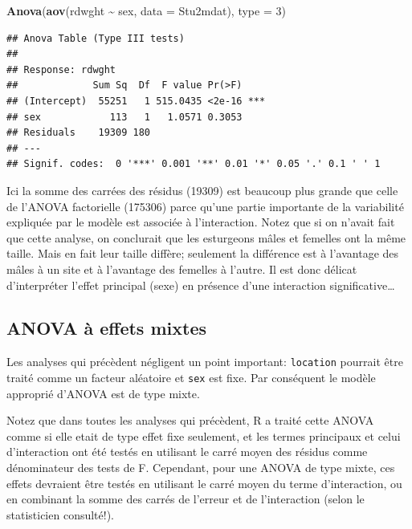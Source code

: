 \documentclass[
  12pt,
]{book}
\newenvironment{Shaded}{\begin{snugshade}}{\end{snugshade}}
\newcommand{\DataTypeTok}[1]{\textcolor[rgb]{0.13,0.29,0.53}{#1}}
\newcommand{\DecValTok}[1]{\textcolor[rgb]{0.00,0.00,0.81}{#1}}
\newcommand{\KeywordTok}[1]{\textcolor[rgb]{0.13,0.29,0.53}{\textbf{#1}}}
\newcommand{\NormalTok}[1]{#1}
\newcommand{\OperatorTok}[1]{\textcolor[rgb]{0.81,0.36,0.00}{\textbf{#1}}}
\newcommand{\StringTok}[1]{\textcolor[rgb]{0.31,0.60,0.02}{#1}}
\begin{document}
\begin{Shaded}
\begin{Highlighting}[]
\KeywordTok{Anova}\NormalTok{(}\KeywordTok{aov}\NormalTok{(rdwght }\OperatorTok{\textasciitilde{}}\StringTok{ }\NormalTok{sex, }\DataTypeTok{data =}\NormalTok{ Stu2mdat), }\DataTypeTok{type =} \DecValTok{3}\NormalTok{)}
\end{Highlighting}
\end{Shaded}

\begin{verbatim}
## Anova Table (Type III tests)
## 
## Response: rdwght
##             Sum Sq  Df  F value Pr(>F)    
## (Intercept)  55251   1 515.0435 <2e-16 ***
## sex            113   1   1.0571 0.3053    
## Residuals    19309 180                    
## ---
## Signif. codes:  0 '***' 0.001 '**' 0.01 '*' 0.05 '.' 0.1 ' ' 1
\end{verbatim}

Ici la somme des carrées des résidus (19309) est beaucoup plus grande que celle de l'ANOVA factorielle (175306) parce qu'une partie importante de la variabilité expliquée par le modèle est associée à l'interaction. Notez que si on n'avait fait que cette analyse, on conclurait que les esturgeons mâles et femelles ont la même taille. Mais en fait leur taille diffère; seulement la différence est à l'avantage des mâles à un site et à l'avantage des femelles à l'autre. Il est donc délicat d'interpréter l'effet principal (sexe) en présence d'une interaction significative\ldots{}

\hypertarget{anova-uxe0-effets-mixtes}{%
\subsection{ANOVA à effets mixtes}\label{anova-uxe0-effets-mixtes}}

Les analyses qui précèdent négligent un point important: \texttt{location} pourrait être traité comme un facteur aléatoire et \texttt{sex} est fixe. Par conséquent le modèle approprié d'ANOVA est de type mixte.

Notez que dans toutes les analyses qui précèdent, R a traité cette ANOVA comme si elle etait de type effet fixe seulement, et les termes principaux et celui d'interaction ont été testés en utilisant le carré moyen des résidus comme dénominateur des tests de F. Cependant, pour une ANOVA de type mixte, ces effets devraient être testés en utilisant le carré moyen du terme d'interaction, ou en combinant la somme des carrés de l'erreur et de l'interaction (selon le statisticien consulté!).
\end{document}
